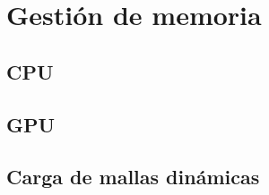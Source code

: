 \section{Gestión de memoria}

\subsection{CPU}

\subsection{GPU}

\subsection{Carga de mallas dinámicas}
